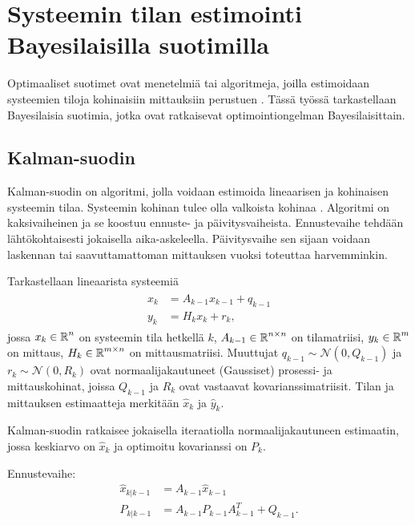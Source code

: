 \chapter{Systeemin tilan estimointi Bayesilaisilla suotimilla}%
\label{ch:estimointi}
Optimaaliset suotimet ovat  menetelmiä tai algoritmeja, joilla estimoidaan systeemien tiloja kohinaisiin mittauksiin perustuen \cite{sarkka_bayesian}. Tässä työssä tarkastellaan Bayesilaisia suotimia, jotka ovat ratkaisevat optimointiongelman Bayesilaisittain. 


\section{Kalman-suodin}

Kalman-suodin on algoritmi, jolla voidaan estimoida lineaarisen ja kohinaisen systeemin tilaa. Systeemin kohinan tulee olla valkoista kohinaa \cite[s. 56]{sarkka_bayesian}. Algoritmi on kaksivaiheinen ja se koostuu ennuste- ja päivitysvaiheista. 
Ennustevaihe tehdään lähtökohtaisesti jokaisella aika-askeleella. Päivitysvaihe sen sijaan voidaan laskennan tai saavuttamattoman mittauksen vuoksi toteuttaa harvemminkin. 

Tarkastellaan lineaarista systeemiä
\begin{align}
    \begin{split}
        x_k &= A_{k-1}x_{k-1} + q_{k-1} \\
        y_k &= H_k x_k + r_k,
    \end{split}
\end{align}
jossa \(x_k \in \operatorname{\mathbb{R}}^n \) on systeemin tila hetkellä \(k\), \(A_{k-1}\in \operatorname{\mathbb{R}}^{n\times n}\) on tilamatriisi, \(y_k\in \operatorname{\mathbb{R}}^m\) on mittaus, \(H_k \in \operatorname{\mathbb{R}}^{m \times n}\) on mittausmatriisi. Muuttujat \(q_{k-1} \sim \mathcal{N}(0, Q_{k-1})\) ja \(r_k \sim \mathcal{N}(0, R_k)\) ovat normaalijakautuneet (Gaussiset) prosessi- ja mittauskohinat, joissa \(Q_{k-1}\) ja \(R_k\) ovat vastaavat kovarianssimatriisit. Tilan ja mittauksen estimaatteja merkitään \(\hat{x}_k\) ja \(\hat{y}_k\).

Kalman-suodin ratkaisee jokaisella iteraatiolla normaalijakautuneen estimaatin, jossa keskiarvo on \(\hat{x}_k\) ja optimoitu kovarianssi on \(P_k\).  

Ennustevaihe:
\begin{align}
    \hat{x}_{k | k-1}  &= A_{k-1} \hat{x}_{k-1}\\
    P_{k | k-1} &= A_{k-1} P_{k-1} A_{k-1}^T + Q_{k-1}.
\end{align}


